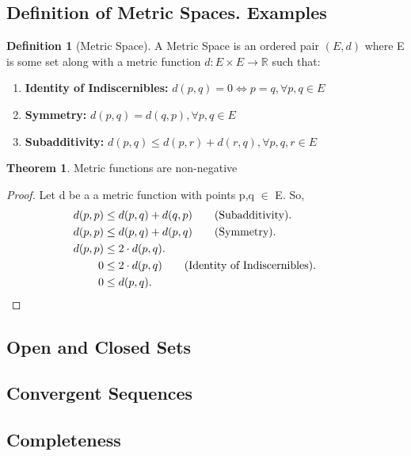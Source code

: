 \documentclass{article}
\theoremstyle{definition}
\newtheorem{definition}{Definition}[section]
\theoremstyle{theorem}
\newtheorem{theorem}{Theorem}[section]
\begin{document}
		\subsection{Definition of Metric Spaces. Examples}
			
			\begin{definition}[Metric Space]
				A Metric Space is an ordered pair $(E, d)$ where E is some set along with a metric function $d \colon E \times E \to \mathbb{R}$
				 such that:
				 \begin{enumerate}
				 	\item \textbf{Identity of Indiscernibles:} $d(p,q) = 0 \Leftrightarrow p=q, \forall p,q \in E$
				 	\item \textbf{Symmetry:} $d(p,q) = d(q,p), \forall p,q \in E$
				 	\item \textbf{Subadditivity:} $d(p,q) \leq d(p,r) + d(r,q), \forall p,q,r \in E$
				 \end{enumerate}
			\end{definition}
		
			\begin{theorem}
				Metric functions are non-negative
			\end{theorem}
			\begin{proof}
				Let d be a a metric function with points p,q $\in$ E. So,\\
				\begin{align*}
					d(p,p) &\leq d(p,q) + d(q,p) \tag{Subadditivity}. \\
					d(p,p) &\leq d(p,q) + d(p,q) \tag{Symmetry}. \\
					d(p,p) &\leq 2 \cdot d(p,q). \\
					0 &\leq 2 \cdot d(p,q) \tag{Identity of Indiscernibles}. \\
					0 &\leq d(p,q). &&\qedhere
				\end{align*}
			\end{proof}

		

		\subsection{Open and Closed Sets}
		
		\subsection{Convergent Sequences}
		
		\subsection{Completeness}
		
\end{document}
